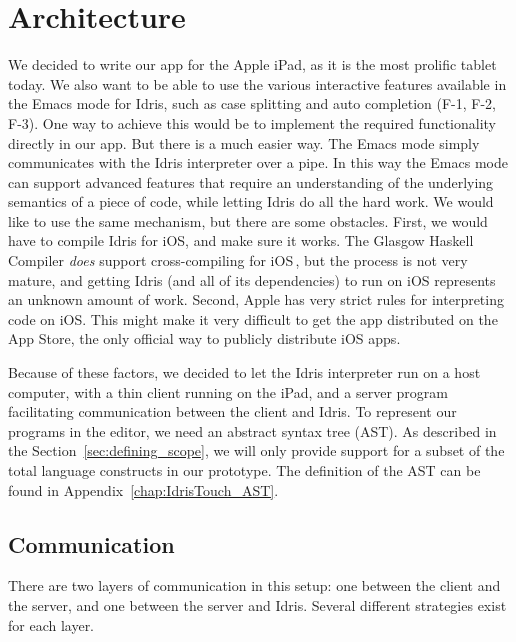 \chapter{Architecture}
\label{sec:Architecture}

We decided to write our app for the Apple iPad, as it is the most prolific
tablet today. We also want to be able to use the various interactive features
available in the Emacs mode for Idris, such as case
splitting and auto completion (F-1, F-2, F-3). One way to achieve this would be to implement
the required functionality directly in our app. But there is a much easier way.
The Emacs mode simply communicates with the Idris interpreter over a pipe. 
In this way the Emacs mode can support advanced features that require an
understanding of the underlying semantics of a piece of code, while letting
Idris do all the hard work. We would like to use the same mechanism, but there
are some obstacles. First, we would have to compile Idris for iOS, and make 
sure it works. The Glasgow Haskell Compiler \emph{does} support 
cross-compiling for iOS\,\cite{ghc_ios_crosscompiler}, but the process is not very mature, and
getting Idris (and all of its dependencies) to run on iOS represents an 
unknown amount of work. Second, Apple has very strict rules for interpreting
code on iOS\@. This might make it very difficult to get the app distributed on
the App Store, the only official way to publicly distribute iOS apps.

Because of these factors, we decided to let the Idris interpreter run on a 
host computer, with a thin client running on the iPad, and a server program 
facilitating communication between the client and Idris.
To represent our programs in the editor, we need an abstract syntax tree (AST).
As described in the Section~\ref{sec:defining_scope}, we will only
provide support for a subset of the total language constructs in our prototype.
The definition of the AST can be found in Appendix~\ref{chap:IdrisTouch_AST}.


\section{Communication}
There are two layers of communication in this setup: one between the client and
the server, and one between the server and Idris. Several different strategies
exist for each layer. 

